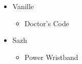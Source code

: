 \begin{menu}
\begin{multicols}{2}
\begin{itemize}
\begin{itemize}
\begin{itemize}
              \end{itemize}
      \end{itemize}
      \equip
      \begin{itemize}
        \item Vanille
              \begin{itemize}
                \item Doctor's Code
              \end{itemize}
        \item Sazh
              \begin{itemize}
                \item Power Wristband
              \end{itemize}
      \end{itemize}
    \end{itemize}
  \end{multicols}
\end{menu}

